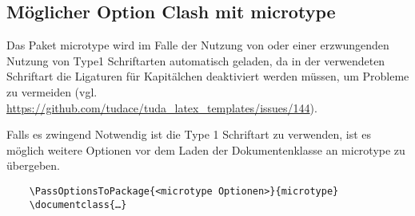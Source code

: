 \documentclass[
	ngerman,
	accentcolor=9c,%
	]{tudapub}
\let\pck\textsf
\begin{document}
\subsection{Möglicher Option Clash mit microtype}
Das Paket microtype wird im Falle der Nutzung von  oder einer erzwungenden Nutzung von Type1 Schriftarten automatisch geladen, da in der verwendeten Schriftart die Ligaturen für Kapitälchen deaktiviert werden müssen, um Probleme zu vermeiden (vgl. \url{https://github.com/tudace/tuda_latex_templates/issues/144}).

Falls es zwingend Notwendig ist die Type 1 Schriftart zu verwenden, ist es möglich weitere Optionen vor dem Laden der Dokumentenklasse an \pck{microtype} zu übergeben.

\begin{verbatim}
	\PassOptionsToPackage{<microtype Optionen>}{microtype}
	\documentclass{…}
\end{verbatim}
\appendix
\printbibliography
\end{document}
